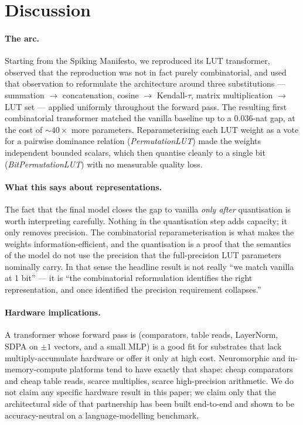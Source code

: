 \documentclass[11pt]{article}
\begin{document}
\section{Discussion}
\label{sec:discussion}

\paragraph{The arc.}
Starting from the Spiking Manifesto, we reproduced its LUT transformer, observed that the reproduction was not in fact purely combinatorial, and used that observation to reformulate the architecture around three substitutions --- summation $\to$ concatenation, cosine $\to$ Kendall-$\tau$, matrix multiplication $\to$ LUT set --- applied uniformly throughout the forward pass.
The resulting first combinatorial transformer matched the vanilla baseline up to a $0.036$-nat gap, at the cost of $\sim\!40\times$ more parameters.
Reparameterising each LUT weight as a vote for a pairwise dominance relation (\emph{PermutationLUT}) made the weights independent bounded scalars, which then quantise cleanly to a single bit (\emph{BitPermutationLUT}) with no measurable quality loss.

\paragraph{What this says about representations.}
The fact that the final model closes the gap to vanilla \emph{only after} quantisation is worth interpreting carefully.
Nothing in the quantisation step adds capacity; it only removes precision.
The combinatorial reparameterisation is what makes the weights information-efficient, and the quantisation is a proof that the semantics of the model do not use the precision that the full-precision LUT parameters nominally carry.
In that sense the headline result is not really ``we match vanilla at 1 bit'' --- it is ``the combinatorial reformulation identifies the right representation, and once identified the precision requirement collapses.''

\paragraph{Hardware implications.}
A transformer whose forward pass is (comparators, table reads, LayerNorm, SDPA on $\pm 1$ vectors, and a small MLP) is a good fit for substrates that lack multiply-accumulate hardware or offer it only at high cost.
Neuromorphic and in-memory-compute platforms tend to have exactly that shape: cheap comparators and cheap table reads, scarce multiplies, scarce high-precision arithmetic.
We do not claim any specific hardware result in this paper; we claim only that the architectural side of that partnership has been built end-to-end and shown to be accuracy-neutral on a language-modelling benchmark.
\end{document}
